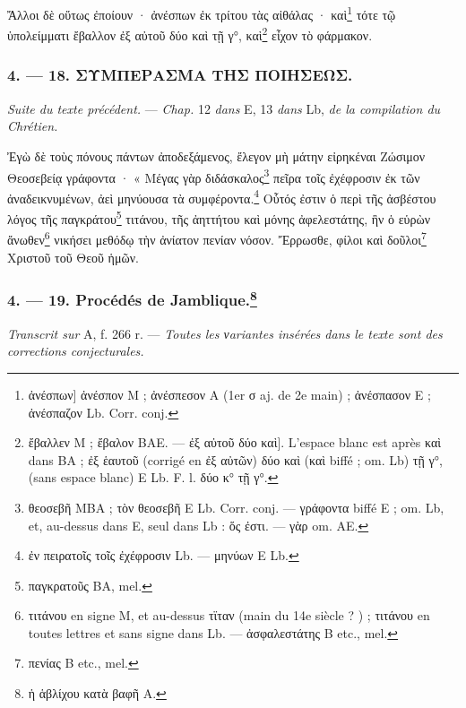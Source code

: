 \documentclass[a4paper, 11pt, oneside, polutonikogreek, french]{article}
\begin{document}
Ἄλλοι δὲ οὕτως ἐποίουν · ἀνέσπων ἐκ τρίτου τὰς αἰθάλας · καὶ\footnote{ἀνέσπων] ἀνέσπον M ; ἀνέσπεσον A (1er σ aj. de 2e main) ; ἀνέσπασον E ; ἀνέσπαζον Lb. Corr. conj.} τότε τῷ ὑπολείμματι ἔβαλλον ἐξ αὐτοῦ δύο    καὶ τῇ γ°, καὶ\footnote{ἔβαλλεν M ; ἔβαλον BAE. --- ἐξ αὐτοῦ δύο    καὶ]. L'espace blanc est après καὶ dans BA ; ἐξ ἑαυτοῦ (corrigé en ἐξ αὐτῶν) δύο καὶ (καὶ biffé ; om. Lb) τῇ γ°, (sans espace blanc) E Lb. F. l. δύο κ° τῇ γ°.} εἶχον τὸ φάρμακον.

\bigskip
\centerline{\EightStarTaper}
\centerline{\EightStarTaper\EightStarTaper}
\bigskip

\subsubsection{4. --- 18. ΣΥΜΠΕΡΑΣΜΑ ΤΗΣ ΠΟΙΗΣΕΩΣ.}

\emph{Suite du texte précédent.} --- \emph{Chap.} 12 \emph{dans} E, 13 \emph{dans} Lb, \emph{de la compilation du Chrétien.}

Ἐγὼ δὲ τοὺς πόνους πάντων ἀποδεξάμενος, ἔλεγον μὴ μάτην εἰρηκέναι Ζώσιμον Θεοσεβείᾳ γράφοντα · « Μέγας γὰρ διδάσκαλος\footnote{θεοσεβῆ MBA ; τὸν θεοσεβῆ E Lb. Corr. conj. --- γράφοντα biffé E ; om. Lb, et, au-dessus dans E, seul dans Lb : ὅς ἐστι. --- γὰρ om. AE.} πεῖρα τοῖς ἐχέφροσιν ἐκ τῶν ἀναδεικνυμένων, ἀεὶ μηνύουσα τὰ συμφέροντα.\footnote{ἐν πειρατοῖς τοῖς ἐχέφροσιν Lb. --- μηνύων E Lb.} Οὗτός ἐστιν ὁ περὶ τῆς ἀσβέστου λόγος τῆς παγκράτου\footnote{παγκρατοῦς BA, mel.} τιτάνου, τῆς ἀηττήτου καὶ μόνης ἀφελεστάτης, ἣν ὁ εὑρὼν ἄνωθεν\footnote{τιτάνου en signe M, et au-dessus τϊταν (main du 14e siècle ? ) ; τιτάνου en toutes lettres et sans signe dans Lb. --- ἀσφαλεστάτης B etc., mel.} νικήσει μεθόδῳ τὴν ἀνίατον πενίαν νόσον. Ἔρρωσθε, φίλοι καὶ δοῦλοι\footnote{πενίας B etc., mel.} Χριστοῦ τοῦ Θεοῦ ἡμῶν.

\bigskip
\centerline{\EightStarTaper}
\centerline{\EightStarTaper\EightStarTaper}
\bigskip

\subsubsection[4. --- 19. Procédés de Jamblique.]{4. --- 19. Procédés de Jamblique.\footnote{ἡ ἁβλίχου κατὰ βαφῆ A.}}

\emph{Transcrit sur} A, f. 266 r. --- \emph{Toutes les νariantes insérées dans le texte sont des corrections conjecturales.}
\end{document}
